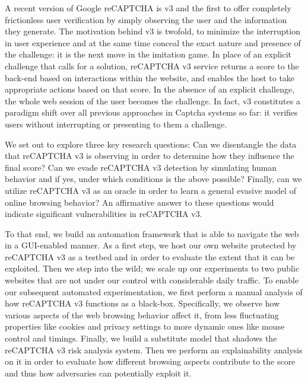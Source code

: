 A recent version of Google reCAPTCHA is v3 and the first to offer completely frictionless user verification by simply observing the user and the information they generate.
The motivation behind v3 is twofold, to minimize the interruption in user experience and at the same time conceal the exact nature and presence of the challenge: it is the next move in the imitation game.
In place of an explicit challenge that calls for a solution, reCAPTCHA v3 service returns a score to the back-end based on interactions within the website, and enables the host to take appropriate actions based on that score.
In the absence of an explicit challenge, the whole web session of the user becomes the challenge.
In fact, v3 constitutes a paradigm shift over all previous approaches in Captcha systems so far: it verifies users without interrupting or presenting to them a challenge.

We set out to explore three key research questions:
Can we disentangle the data that reCAPTCHA v3 is observing in order to determine how they influence the final score?
Can we evade reCAPTCHA v3 detection by simulating human behavior and if yes, under which conditions is the above possible?
Finally, can we utilize reCAPTCHA v3 as an oracle in order to learn a general evasive model of online browsing behavior?
An affirmative answer to these questions would indicate significant vulnerabilities in reCAPTCHA v3.

To that end, we build an automation framework that is able to navigate the web in a GUI-enabled manner.
As a first step, we host our own website protected by reCAPTCHA v3 as a testbed and in order to evaluate the extent that it can be exploited.
Then we step into the wild; we scale up our experiments to two public websites that are not under our control with considerable daily traffic.
To enable our subsequent automated experimentation, we first perform a manual analysis of how reCAPTCHA v3 functions as a black-box.
Specifically, we observe how various aspects of the web browsing behavior affect it, from less fluctuating properties like cookies and privacy settings to more dynamic ones like mouse control and timings.
Finally, we build a substitute model that shadows the reCAPTCHA v3 risk analysis system.
Then we perform an explainability analysis on it in order to evaluate how different browsing aspects contribute to the score and thus how adversaries can potentially exploit it.

